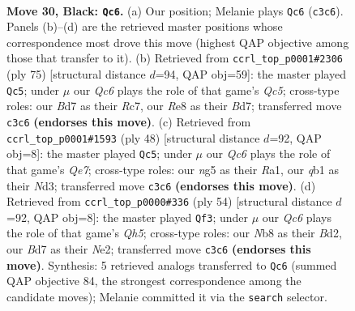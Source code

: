 \documentclass[11pt]{article}
\begin{document}
\clearpage

\begin{figure}[p]\centering
\begin{subfigure}{0.46\textwidth}\centering
\resizebox{\linewidth}{!}{%
\newchessgame
\chessboard[
  setfen={1n2r1k1/3b1ppp/8/4PpN1/p4P2/2q5/P1P2KPP/1Q3B1R b - - 3 30},
  showmover=false,
  pgfstyle=straightmove, color=movearrow, markmove={c3-c6}
]}
\caption{}
\end{subfigure}\hfill
\begin{subfigure}{0.46\textwidth}\centering
\resizebox{\linewidth}{!}{%
\newchessgame
\chessboard[
  setfen={8/2rb1pk1/3p1p2/3Pp2P/p1q1P3/R1P3P1/5PBK/3Q4 b - - 0 38},
  showmover=false,
  pgfstyle=straightmove, color=movearrow, markmove={c4-c5}
]}
\caption{}
\end{subfigure}
\\[4pt]
\begin{subfigure}{0.46\textwidth}\centering
\resizebox{\linewidth}{!}{%
\newchessgame
\chessboard[
  setfen={r5k1/4Q1pp/bq2ppn1/1p6/p1nP2P1/3N2B1/4PP1P/R1R3K1 w - - 4 25},
  showmover=false,
  pgfstyle=straightmove, color=movearrow, markmove={e7-c5}
]}
\caption{}
\end{subfigure}\hfill
\begin{subfigure}{0.46\textwidth}\centering
\resizebox{\linewidth}{!}{%
\newchessgame
\chessboard[
  setfen={2bq1r1k/1p4np/2pp4/7Q/2P2P1b/3P3P/3BN1BK/1R6 w - - 4 28},
  showmover=false,
  pgfstyle=straightmove, color=movearrow, markmove={h5-f3}
]}
\caption{}
\end{subfigure}
\caption{\textbf{Move 30, Black: \texttt{Qc6}.} (a) Our position; Melanie plays \texttt{Qc6} (\texttt{c3c6}). Panels (b)--(d) are the retrieved master positions whose correspondence most drove this move (highest QAP objective among those that transfer to it). (b) Retrieved from \texttt{ccrl\_top\_p0001\#2306} (ply 75) [structural distance $d$=94, QAP obj=59]: the master played \texttt{Qc5}; under $\mu$ our \emph{Qc6} plays the role of that game's \emph{Qc5}; cross-type roles: our \emph{B}d7 as their \emph{R}c7, our \emph{R}e8 as their \emph{B}d7; transferred move \texttt{c3c6} \textbf{(endorses this move)}. (c) Retrieved from \texttt{ccrl\_top\_p0001\#1593} (ply 48) [structural distance $d$=92, QAP obj=8]: the master played \texttt{Qc5}; under $\mu$ our \emph{Qc6} plays the role of that game's \emph{Qe7}; cross-type roles: our \emph{n}g5 as their \emph{R}a1, our \emph{q}b1 as their \emph{N}d3; transferred move \texttt{c3c6} \textbf{(endorses this move)}. (d) Retrieved from \texttt{ccrl\_top\_p0000\#336} (ply 54) [structural distance $d$=92, QAP obj=8]: the master played \texttt{Qf3}; under $\mu$ our \emph{Qc6} plays the role of that game's \emph{Qh5}; cross-type roles: our \emph{N}b8 as their \emph{B}d2, our \emph{B}d7 as their \emph{N}e2; transferred move \texttt{c3c6} \textbf{(endorses this move)}. Synthesis: 5 retrieved analogs transferred to \texttt{Qc6} (summed QAP objective 84, the strongest correspondence among the candidate moves); Melanie committed it via the \texttt{search} selector.}
\label{fig:thought-m59}
\end{figure}
\end{document}
